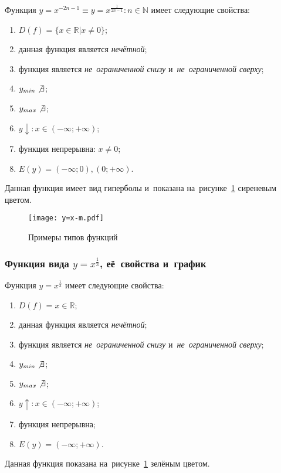 \documentclass[]{scrartcl}
\begin{document}
Функция ${\textstyle y=x^{-2n-1} \equiv y=x^{\frac{1}{2n-1}} : n \in \mathbb{N}}$ имеет следующие свойства:
\begin{enumerate}
	\item ${\textstyle D(f)=\{x \in \mathbb{R} | x \neq 0\}}$;
	\item данная функция является \emph{нечётной};
	\item функция является \emph{не~ограниченной снизу} и~\emph{не~ограниченной сверху};
	\item ${\textstyle y_{min}\not \exists}$;
	\item ${\textstyle y_{max}\not \exists}$;
	\item ${\textstyle y\downarrow:x\in (-\infty;+\infty)}$;
	\item функция непрерывна: ${\textstyle x \neq 0}$;
	\item ${\textstyle E(y)=(-\infty;0),(0;+\infty)}$.
\end{enumerate}
Данная функция имеет вид гиперболы и~показана на~рисунке~\ref{fig:y=x^m} сиреневым цветом.

\begin{figure}[ht]
	\centering %
	\texttt{[image: y=x-m.pdf]}
	\caption{Примеры типов функций}\label{fig:y=x^m}
\end{figure}

\subsubsection{Функция вида ${\textstyle y=x^{\frac{1}{3}}}$, её~свойства и~график}
Функция ${\textstyle y=x^{\frac{1}{3}}}$ имеет следующие свойства:
\begin{enumerate}
	\item ${\textstyle D(f)=x \in \mathbb{R}}$;
	\item данная функция является \emph{нечётной};
	\item функция является \emph{не~ограниченной снизу} и~\emph{не~ограниченной сверху};
	\item ${\textstyle y_{min}\not \exists}$;
	\item ${\textstyle y_{max}\not \exists}$;
	\item ${\textstyle y\uparrow:x\in (-\infty;+\infty)}$;
	\item функция непрерывна;
	\item ${\textstyle E(y)=(-\infty;+\infty)}$.
\end{enumerate}
Данная функция показана на~рисунке~\ref{fig:y=x^m} зелёным цветом.
\end{document}
